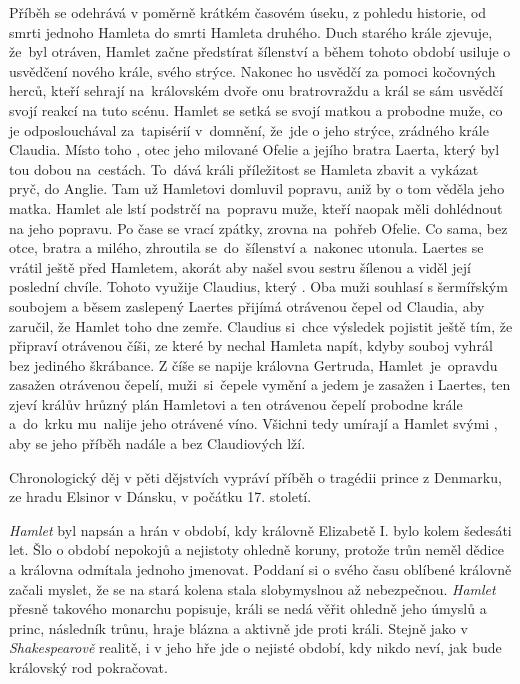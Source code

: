 \documentclass[FGBook.tex]{subfiles}
\begin{document}
\noindent 
Příběh se odehrává v poměrně krátkém časovém úseku, z pohledu historie,
od smrti jednoho Hamleta do smrti Hamleta druhého.
Duch starého krále zjevuje, že~byl otráven, Hamlet začne předstírat šílenství
a během tohoto období usiluje o usvědčení nového krále, svého strýce.
Nakonec ho usvědčí za pomoci kočovných herců, kteří sehrají na~královském dvoře onu bratrovraždu
a král se sám usvědčí svojí reakcí na tuto scénu.
Hamlet se setká se svojí matkou a probodne muže, co je odposlouchával za~tapisérií v~domnění,
že~jde o jeho strýce, zrádného krále Claudia.
Místo toho , otec jeho milované Ofelie a jejího bratra Laerta,
který byl tou dobou na~cestách.
To~dává králi příležitost se Hamleta zbavit a vykázat pryč, do Anglie.
Tam už Hamletovi domluvil popravu, aniž by o tom věděla jeho matka.
Hamlet ale lstí podstrčí na~popravu muže, kteří naopak měli dohlédnout na jeho popravu.
Po čase se vrací zpátky, zrovna na~pohřeb Ofelie.
Co sama, bez otce, bratra a milého, zhroutila se~do~šílenství a~nakonec utonula.
Laertes se vrátil ještě před Hamletem, akorát aby našel svou sestru šílenou a viděl její poslední chvíle.
Tohoto využije Claudius, který .
Oba muži souhlasí s šermířským soubojem a běsem zaslepený Laertes přijímá otrávenou čepel od Claudia,
aby zaručil, že Hamlet toho dne zemře.
Claudius si~chce výsledek pojistit ještě tím, že připraví otrávenou číši,
ze které by nechal Hamleta napít, kdyby souboj vyhrál bez jediného škrábance.
Z číše se napije královna Gertruda, Hamlet~je~opravdu zasažen otrávenou čepelí,
muži~si~čepele vymění a jedem je zasažen i Laertes, ten zjeví králův hrůzný plán Hamletovi
a ten otrávenou čepelí probodne krále a~do~krku mu~nalije jeho otrávené víno.
Všichni tedy umírají a Hamlet svými ,
aby se jeho příběh nadále  a bez Claudiových lží.

\noindent 
Chronologický děj v pěti dějstvích vypráví příběh o tragédii prince z Denmarku, ze hradu Elsinor v Dánsku, v počátku 17. století.



\noindent
\textit{Hamlet} byl napsán a hrán v období, kdy královně Elizabetě I. bylo kolem šedesáti let.
Šlo o období nepokojů a nejistoty ohledně koruny, protože trůn neměl dědice a královna odmítala jednoho jmenovat.
Poddaní si o svého času oblíbené královně začali myslet, že se na stará kolena stala slobymyslnou až nebezpečnou.
\textit{Hamlet} přesně takového monarchu popisuje, králi se nedá věřit ohledně jeho úmyslů a princ, následník trůnu, hraje blázna a aktivně jde proti králi.
Stejně jako v \textit{Shakespearově} realitě, i v jeho hře jde o nejisté období, kdy nikdo neví, jak bude královský rod pokračovat.
\end{document}
